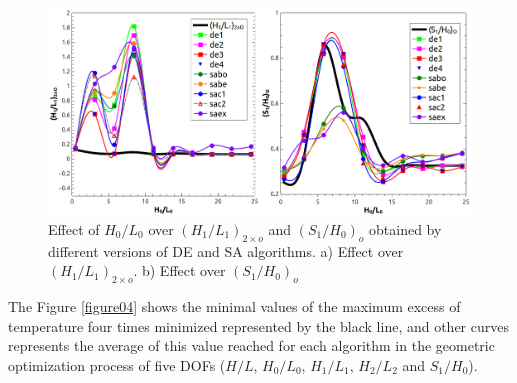 \documentclass[12pt,fleqn]{article}
\begin{document}
\begin{figure}[H]
\centering
\includegraphics[width=1\linewidth]{imgs/4dof/de_sa_h0l0-h1l1-s1h0-4dof.png}
\caption{ {\small Effect of $H_{0}/L_{0}$ over $(H_{1}/L_{1})_{2\times o}$ and $(S_{1}/H_{0})_{o}$ obtained by different versions of DE and SA algorithms. a) Effect over $(H_{1}/L_{1})_{2\times o}$. b) Effect over $(S_{1}/H_{0})_{o}$ }}
\label{figure03}
\end{figure}

The Figure \ref{figure04} shows  the minimal values of the maximum excess of temperature four times minimized represented by the black line, and other curves represents the average of this value reached for each algorithm in the geometric optimization process of five DOFs ($H/L$, $H_{0}/L_{0}$, $H_{1}/L_{1}$, $H_{2}/L_{2}$ and $S_{1}/H_{0}$). 
\end{document}
